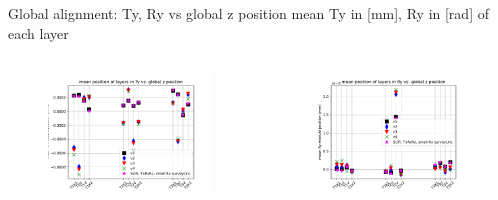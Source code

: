 \documentclass[aspectratio=1610, 12pt]{beamer}
\begin{document}
\begin{frame}{Global alignment: Ty, Ry vs global z position}
  mean Ty in [mm], Ry in [rad] of each layer
  \begin{columns}
    \begin{column}[c]{0.5\textwidth}
      \begin{figure}
        \includegraphics[width=\textwidth]{plots/outfiles_vs_global/all_runs_retest_glob_z_vs_local_Ty.pdf}
      \end{figure}
    \end{column}
    \begin{column}[c]{0.5\textwidth}
      \begin{figure}
        \includegraphics[width=\textwidth]{plots/outfiles_vs_global/all_runs_retest_glob_z_vs_local_Ry.pdf}
      \end{figure}
    \end{column}
  \end{columns}
\end{frame}
\end{document}
